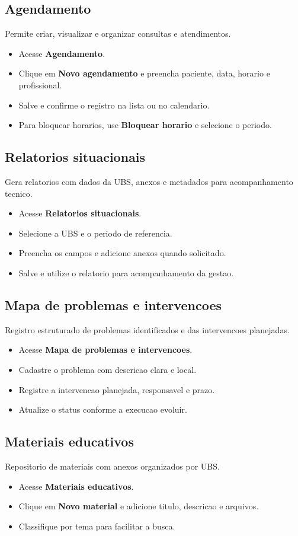 \documentclass[12pt,a4paper]{article}
\begin{document}
\subsection{Agendamento}
Permite criar, visualizar e organizar consultas e atendimentos.
\begin{itemize}[leftmargin=*]
  \item Acesse \textbf{Agendamento}.
  \item Clique em \textbf{Novo agendamento} e preencha paciente, data, horario e profissional.
  \item Salve e confirme o registro na lista ou no calendario.
  \item Para bloquear horarios, use \textbf{Bloquear horario} e selecione o periodo.
\end{itemize}

\subsection{Relatorios situacionais}
Gera relatorios com dados da UBS, anexos e metadados para acompanhamento tecnico.
\begin{itemize}[leftmargin=*]
  \item Acesse \textbf{Relatorios situacionais}.
  \item Selecione a UBS e o periodo de referencia.
  \item Preencha os campos e adicione anexos quando solicitado.
  \item Salve e utilize o relatorio para acompanhamento da gestao.
\end{itemize}

\subsection{Mapa de problemas e intervencoes}
Registro estruturado de problemas identificados e das intervencoes planejadas.
\begin{itemize}[leftmargin=*]
  \item Acesse \textbf{Mapa de problemas e intervencoes}.
  \item Cadastre o problema com descricao clara e local.
  \item Registre a intervencao planejada, responsavel e prazo.
  \item Atualize o status conforme a execucao evoluir.
\end{itemize}

\subsection{Materiais educativos}
Repositorio de materiais com anexos organizados por UBS.
\begin{itemize}[leftmargin=*]
  \item Acesse \textbf{Materiais educativos}.
  \item Clique em \textbf{Novo material} e adicione titulo, descricao e arquivos.
  \item Classifique por tema para facilitar a busca.
\end{itemize}
\end{document}
